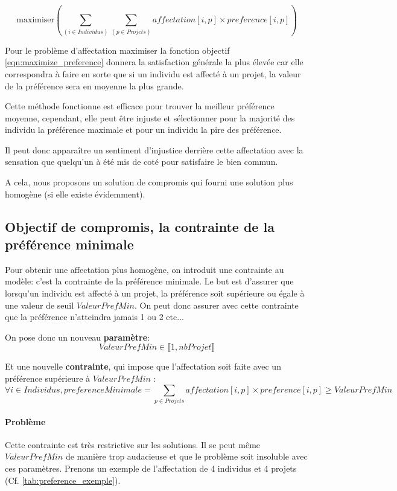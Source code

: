 \documentclass{polytech/polytech}
\begin{document}
\begin{equation}
\label{eqn:maximize_preference}
\text{maximiser} \left( \sum_{(i \in Individus)} \sum_{(p\in Projets)} affectation[i,p]\times preference[i,p] \right)
\end{equation}

Pour le problème d'affectation maximiser la fonction objectif \eqref{eqn:maximize_preference} donnera la satisfaction générale la plus élevée car elle correspondra à faire en sorte que si un individu est affecté à un projet, la valeur de la préférence sera en moyenne la plus grande.

Cette méthode fonctionne est efficace pour trouver la meilleur préférence moyenne, cependant, elle peut être injuste et sélectionner pour la majorité des individu la préférence maximale et pour un individu la pire des préférence.

Il peut donc apparaître un sentiment d'injustice derrière cette affectation avec la sensation que quelqu'un à été mis de coté pour satisfaire le bien commun.

A cela, nous proposons un solution de compromis qui fourni une solution plus homogène (si elle existe évidemment).

\subsection{Objectif de compromis, la contrainte de la préférence minimale}
\label{sec:pref_min}

Pour obtenir une affectation plus homogène, on introduit une contrainte au modèle: c'est la contrainte de la préférence minimale.
Le but est d'assurer que lorsqu'un individu est affecté à un projet, la préférence soit supérieure ou égale à une valeur de seuil $ValeurPrefMin$.
On peut donc assurer avec cette contrainte que la préférence n'atteindra jamais 1 ou 2 etc...

On pose donc un nouveau \textbf{paramètre}:
$$
ValeurPrefMin \in \llbracket 1,nbProjet \rrbracket
$$

Et une nouvelle \textbf{contrainte}, qui impose que l'affectation soit faite avec un préférence supérieure à $ValeurPrefMin$ :
$$
\forall i \in Individus ,preferenceMinimale = \sum_{p \in Projets} affectation[i,p]\times preference[i,p] \geqslant ValeurPrefMin
$$

\paragraph{Problème} Cette contrainte est très restrictive sur les solutions. Il se peut même $ValeurPrefMin$ de manière trop audacieuse et que le problème soit insoluble avec ces paramètres.
Prenons un exemple de l'affectation de 4 individus et 4 projets (Cf. \autoref{tab:preference_exemple}).
\end{document}

